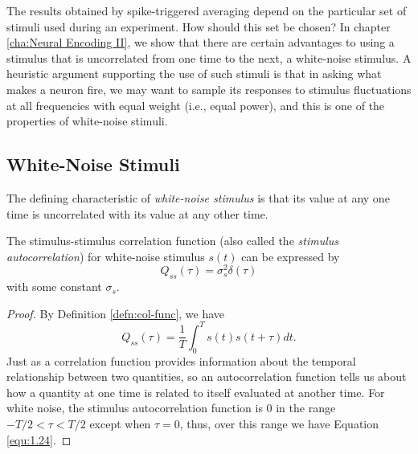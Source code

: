 \begin{rem}
  The results obtained by spike-triggered averaging depend on the particular set of stimuli used during an experiment. How should this set be chosen? In chapter \ref{cha:Neural Encoding II}, we show that there are certain advantages to using a stimulus that is uncorrelated from one time to the next, a white-noise stimulus. A heuristic argument supporting the use of such stimuli is that in asking what makes a neuron fire, we may want to sample its responses to stimulus fluctuations at all frequencies with equal weight (i.e., equal power), and this is one of the properties of white-noise stimuli. %
\end{rem}

\subsection{White-Noise Stimuli}
\label{sec:white-noiseStimuli}

\begin{defn}
  \label{defn:whi-noi sti}
  The defining characteristic of \emph{white-noise stimulus} is that its value at any one time is uncorrelated with its value at any other time.
\end{defn}

\begin{prop}
  \label{prop:whiteNoiseAutocorrelation}
  The stimulus-stimulus correlation function (also called the \emph{stimulus autocorrelation}) for white-noise stimulus $s(t)$ can be expressed by
  \begin{equation}
    \label{equ:1.24}
    Q_{ss}(\tau) = \sigma_s^2\delta(\tau)
  \end{equation}
  with some constant $\sigma_s$.
\end{prop}
\begin{proof}
  By Definition \ref{defn:col-func}, we have
  \begin{equation}
    \label{equ:1.23}
    Q_{ss}(\tau) = \frac{1}{T} \int_0^T s(t)s(t+\tau) dt.
  \end{equation}
  Just as a correlation function provides information about the temporal relationship between two quantities, so an autocorrelation function tells us
about how a quantity at one time is related to itself evaluated at another
time. For white noise, the stimulus autocorrelation function is 0 in the
range $-T/2 < \tau < T/2$ except when $\tau=0$, thus, over this range we have Equation \ref{equ:1.24}.
\end{proof}


